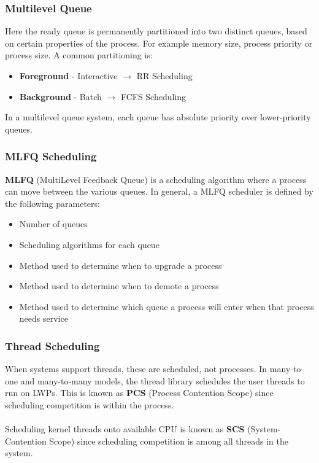 \documentclass{article}
\begin{document}
\subsubsection{Multilevel Queue}
Here the ready queue is permanently partitioned into two distinct queues, based on certain properties of the process. For example memory size, process priority or process size. A common partitioning is:

\begin{itemize}
	\item \textbf{Foreground} - Interactive $\rightarrow$ RR Scheduling
	\item \textbf{Background} - Batch $\rightarrow$ FCFS Scheduling
\end{itemize}
In a multilevel queue system, each queue has absolute priority over lower-priority queues.

\subsubsection{MLFQ Scheduling}
\textbf{MLFQ} (MultiLevel Feedback Queue) is a scheduling algorithm where a process can move between the various queues. In general, a MLFQ scheduler is defined by the following parameters:

\begin{itemize}
	\item Number of queues
	\item Scheduling algorithms for each queue
	\item Method used to determine when to upgrade a process
	\item Method used to determine when to demote a process
	\item Method used to determine which queue a process will enter when that process needs service
\end{itemize}

\subsubsection{Thread Scheduling}

When systems support threads, these are scheduled, not processes. In many-to-one and many-to-many models, the thread library schedules the user threads to run on LWPs. This is known as \textbf{PCS} (Process Contention Scope) since scheduling competition is within the process. \\ \\
Scheduling kernel threads onto available CPU is known as \textbf{SCS} (System-Contention Scope) since scheduling competition is among all threads in the system.
\end{document}
